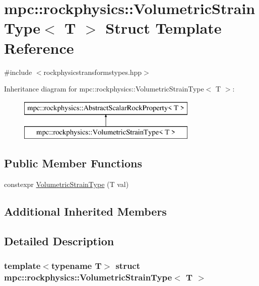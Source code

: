 \hypertarget{structmpc_1_1rockphysics_1_1_volumetric_strain_type}{}\section{mpc\+:\+:rockphysics\+:\+:Volumetric\+Strain\+Type$<$ T $>$ Struct Template Reference}
\label{structmpc_1_1rockphysics_1_1_volumetric_strain_type}


{\ttfamily \#include $<$rockphysicstransformstypes.\+hpp$>$}

Inheritance diagram for mpc\+:\+:rockphysics\+:\+:Volumetric\+Strain\+Type$<$ T $>$\+:\begin{figure}[H]
\begin{center}
\leavevmode
\includegraphics[height=2.000000cm]{structmpc_1_1rockphysics_1_1_volumetric_strain_type}
\end{center}
\end{figure}
\subsection*{Public Member Functions}
\begin{DoxyCompactItemize}
\item 
constexpr \mbox{\hyperlink{structmpc_1_1rockphysics_1_1_volumetric_strain_type_a08a9f46af054ba13d45c3d376e2995f6}{Volumetric\+Strain\+Type}} (T val)
\end{DoxyCompactItemize}
\subsection*{Additional Inherited Members}


\subsection{Detailed Description}
\subsubsection*{template$<$typename T$>$\newline
struct mpc\+::rockphysics\+::\+Volumetric\+Strain\+Type$<$ T $>$}



